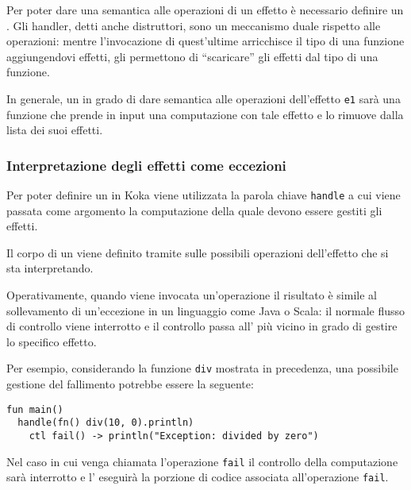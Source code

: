 Per poter dare una semantica alle operazioni di un effetto è necessario definire un . Gli handler, detti anche distruttori, sono un meccanismo duale rispetto alle operazioni: mentre l'invocazione di quest'ultime arricchisce il tipo di una funzione aggiungendovi effetti, gli  permettono di ``scaricare'' gli effetti dal tipo di una funzione.

In generale, un  in grado di dare semantica alle operazioni dell'effetto \lstinline{e1} sarà una funzione che prende in input una computazione con tale effetto e lo rimuove dalla lista dei suoi effetti.

\subsubsection{Interpretazione degli effetti come eccezioni}
Per poter definire un  in Koka viene utilizzata la parola chiave \lstinline{handle} a cui viene passata come argomento la computazione della quale devono essere gestiti gli effetti.

Il corpo di un  viene definito tramite  sulle possibili operazioni dell'effetto che si sta interpretando.

Operativamente, quando viene invocata un'operazione il risultato è simile al sollevamento di un'eccezione in un linguaggio come Java o Scala: il normale flusso di controllo viene interrotto e il controllo passa all' più vicino in grado di gestire lo specifico effetto.

Per esempio, considerando la funzione \lstinline{div} mostrata in precedenza, una possibile gestione del fallimento potrebbe essere la seguente:
\begin{lstlisting}[language=koka]
fun main()
  handle(fn() div(10, 0).println)
    ctl fail() -> println("Exception: divided by zero")
\end{lstlisting}

Nel caso in cui venga chiamata l'operazione \lstinline{fail} il controllo della computazione sarà interrotto e l' eseguirà la porzione di codice associata all'operazione \lstinline{fail}.

